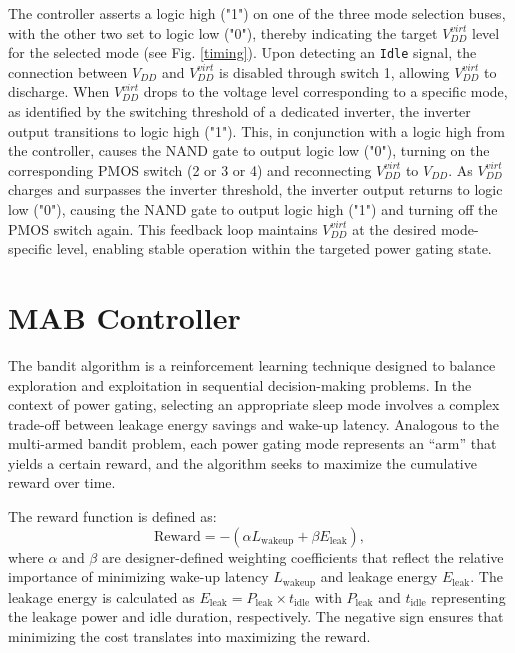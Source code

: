 \documentclass[conference]{IEEEtran}
\begin{document}
The controller asserts a logic high ("1") on one of the three mode selection buses, with the other two set to logic low ("0"), thereby indicating the target $V_{DD}^{virt}$ level for the selected mode (see Fig. \ref{timing}). Upon detecting an \texttt{Idle} signal, the connection between $V_{DD}$ and $V_{DD}^{virt}$ is disabled through switch 1, allowing $V_{DD}^{virt}$ to discharge. When $V_{DD}^{virt}$ drops to the voltage level corresponding to a specific mode, as identified by the switching threshold of a dedicated inverter, the inverter output transitions to logic high ("1"). This, in conjunction with a logic high from the controller, causes the NAND gate to output logic low ("0"), turning on the corresponding PMOS switch (2 or 3 or 4) and reconnecting $V_{DD}^{virt}$ to $V_{DD}$. As $V_{DD}^{virt}$ charges and surpasses the inverter threshold, the inverter output returns to logic low ("0"), causing the NAND gate to output logic high ("1") and turning off the PMOS switch again. This feedback loop maintains $V_{DD}^{virt}$ at the desired mode-specific level, enabling stable operation within the targeted power gating state.


\section{MAB Controller}
\label{The bandit Algorithm and how it's applied}
The bandit algorithm is a reinforcement learning technique designed to balance exploration and exploitation in sequential decision-making problems. In the context of power gating, selecting an appropriate sleep mode involves a complex trade-off between leakage energy savings and wake-up latency. Analogous to the multi-armed bandit problem, each power gating mode represents an ``arm'' that yields a certain reward, and the algorithm seeks to maximize the cumulative reward over time.

The reward function is defined as:
\begin{equation}
    \text{Reward} = -(\alpha L_{\text{wakeup}} + \beta E_{\text{leak}}),
\end{equation}
where $\alpha$ and $\beta$ are designer-defined weighting coefficients that reflect the relative importance of minimizing wake-up latency $L_{\text{wakeup}}$ and leakage energy $E_{\text{leak}}$. The leakage energy is calculated as $E_{\text{leak}} = P_{\text{leak}} \times t_{\text{idle}}$
with $P_{\text{leak}}$ and $t_{\text{idle}}$ representing the leakage power and idle duration, respectively. The negative sign ensures that minimizing the cost translates into maximizing the reward.
\end{document}
